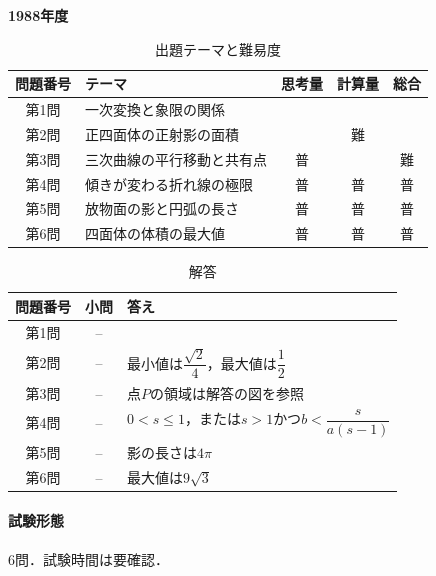 \documentclass[../../main.tex]{subfiles}
\begin{document}
\begin{center}
  {\fontsize{48pt}{58pt}\selectfont \textbf{1988}\normalsize\textbf{年度}}
\end{center}

\begin{table}[htb]
  \centering
  \caption{出題テーマと難易度}
  \begin{tabular}{|c|p{6.2cm}|c|c|c|}
    \hline
    \textbf{問題番号} & \textbf{テーマ} & \textbf{思考量} & \textbf{計算量} & \textbf{総合} \\
    \hline
    第1問 & 一次変換と象限の関係 &  &  &  \\
    \hline
    第2問 & 正四面体の正射影の面積 &  & 難 &  \\
    \hline
    第3問 & 三次曲線の平行移動と共有点 & 普 &  & 難 \\
    \hline
    第4問 & 傾きが変わる折れ線の極限 & 普 & 普 & 普 \\
    \hline
    第5問 & 放物面の影と円弧の長さ & 普 & 普 & 普 \\
    \hline
    第6問 & 四面体の体積の最大値 & 普 & 普 & 普 \\
    \hline
  \end{tabular}
\end{table}

\begin{table}[htb]
  \centering
  \caption{解答}
  \renewcommand{\arraystretch}{1.4}
  \begin{tabular}{|c|c|p{9cm}|}
    \hline
    \textbf{問題番号} & \textbf{小問} & \textbf{答え} \\
    \hline
    第1問 & -- & \\
    \hline
    第2問 & -- & 最小値は$\dfrac{\sqrt{2}}{4}$，最大値は$\dfrac{1}{2}$ \\
    \hline
    第3問 & -- & 点$P$の領域は解答の図を参照 \\
    \hline
    第4問 & -- & $0<s\le1$，または$s>1$かつ$b<\dfrac{s}{a(s-1)}$ \\
    \hline
    第5問 & -- & 影の長さは$4\pi$ \\
    \hline
    第6問 & -- & 最大値は$9\sqrt{3}$ \\
    \hline
  \end{tabular}
\end{table}

\paragraph{試験形態}
6問．試験時間は要確認．
\end{document}

